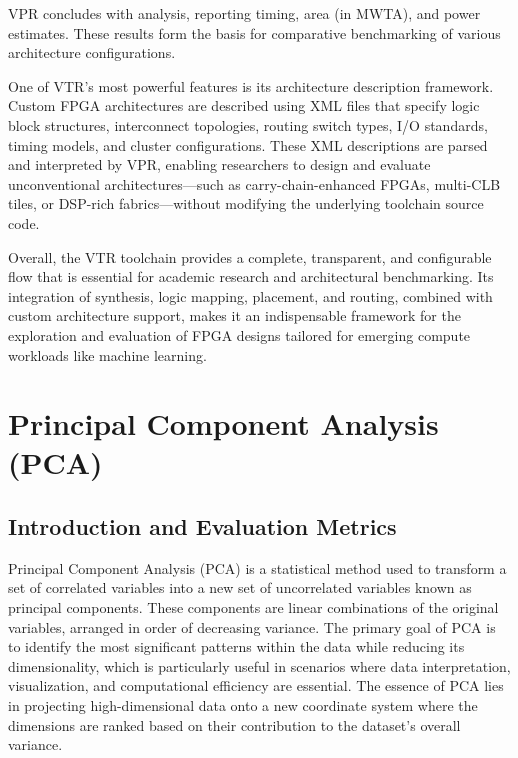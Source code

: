 VPR concludes with analysis, reporting timing, area (in MWTA), and power estimates. These results form the basis for comparative benchmarking of various architecture configurations\cite{vtr-toolchain-5}.

One of VTR’s most powerful features is its architecture description framework. Custom FPGA architectures are described using XML files that specify logic block structures, interconnect topologies, routing switch types, I/O standards, timing models, and cluster configurations. These XML descriptions are parsed and interpreted by VPR, enabling researchers to design and evaluate unconventional architectures—such as carry-chain-enhanced FPGAs, multi-CLB tiles, or DSP-rich fabrics—without modifying the underlying toolchain source code.

Overall, the VTR toolchain provides a complete, transparent, and configurable flow that is essential for academic research and architectural benchmarking. Its integration of synthesis, logic mapping, placement, and routing, combined with custom architecture support, makes it an indispensable framework for the exploration and evaluation of FPGA designs tailored for emerging compute workloads like machine learning.


\section{Principal Component Analysis (PCA)}
\subsection{Introduction and Evaluation Metrics}
Principal Component Analysis (PCA) is a statistical method used to transform a set of correlated variables into a new set of uncorrelated variables known as principal components. These components are linear combinations of the original variables, arranged in order of decreasing variance. The primary goal of PCA is to identify the most significant patterns within the data while reducing its dimensionality, which is particularly useful in scenarios where data interpretation, visualization, and computational efficiency are essential. The essence of PCA lies in projecting high-dimensional data onto a new coordinate system where the dimensions are ranked based on their contribution to the dataset's overall variance\cite{pca-1}\cite{pca-2}.

